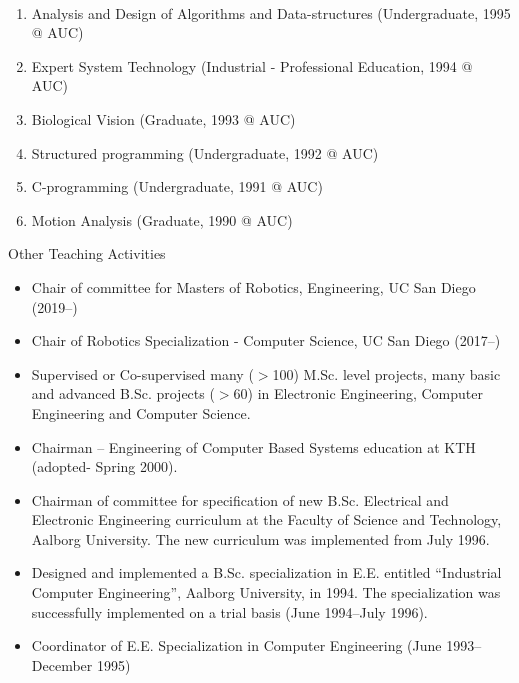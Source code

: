 \documentclass{article}
\begin{document}
\begin{cv}
\begin{cvlist}{~}
\begin{enumerate}
  \item Analysis and Design of Algorithms and Data-structures
    (Undergraduate, 1995 @ AUC)
  \item Expert System Technology (Industrial - Professional Education,
    1994 @ AUC)
  \item Biological Vision (Graduate, 1993 @ AUC)
  \item Structured programming (Undergraduate, 1992 @ AUC)
  \item C-programming (Undergraduate, 1991 @ AUC)
  \item Motion Analysis (Graduate, 1990 @ AUC)
 \end{enumerate}

\item[Other Teaching Activities]
  \begin{itemize}
  \item Chair of committee for Masters of Robotics, Engineering, 
    UC San Diego (2019--)

  \item Chair of Robotics Specialization - Computer Science, UC San
    Diego (2017--)

  \item Supervised or Co-supervised many ($>$100) M.Sc. level projects,
    many basic and advanced B.Sc. projects ($>$60) in Electronic
    Engineering, Computer Engineering and Computer Science.

  \item Chairman -- Engineering of Computer Based Systems education at
    KTH (adopted- Spring 2000).

  \item Chairman of committee for specification of new B.Sc. Electrical
    and Electronic Engineering curriculum at the Faculty of Science and
    Technology, Aalborg University.  The new curriculum was implemented
    from July 1996.

  \item Designed and implemented a B.Sc. specialization in E.E.
    entitled ``Industrial Computer Engineering'', Aalborg University, in
    1994.  The specialization was successfully implemented on a trial
    basis (June 1994--July 1996).

  \item Coordinator of E.E. Specialization in Computer Engineering (June
    1993--December 1995)
\end{itemize}
\end{cvlist}



\end{cv}
\end{document}
